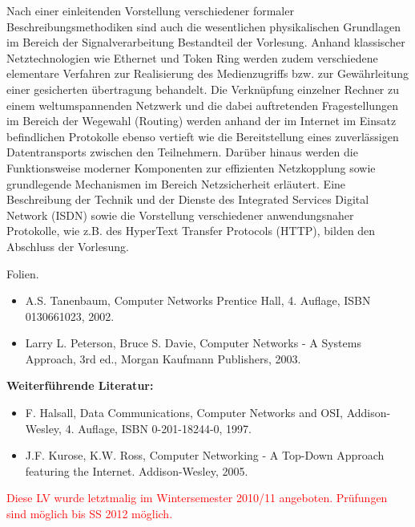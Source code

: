 \begin{course}
\begin{content}
Nach einer einleitenden Vorstellung verschiedener formaler Beschreibungsmethodiken sind auch die wesentlichen physikalischen Grundlagen im Bereich der Signalverarbeitung Bestandteil der Vorlesung. Anhand klassischer Netztechnologien wie Ethernet und Token Ring werden zudem verschiedene elementare Verfahren zur Realisierung des Medienzugriffs bzw. zur Gewährleitung einer gesicherten übertragung behandelt. Die Verknüpfung einzelner Rechner zu einem weltumspannenden Netzwerk und die dabei auftretenden Fragestellungen im Bereich der Wegewahl (Routing) werden anhand der im Internet im Einsatz befindlichen Protokolle ebenso vertieft wie die Bereitstellung eines zuverlässigen Datentransports zwischen den Teilnehmern. Darüber hinaus werden die Funktionsweise moderner Komponenten zur effizienten Netzkopplung sowie grundlegende Mechanismen im Bereich Netzsicherheit erläutert. Eine Beschreibung der Technik und der Dienste des Integrated Services Digital Network (ISDN) sowie die Vorstellung verschiedener anwendungsnaher Protokolle, wie z.B. des HyperText Transfer Protocols (HTTP), bilden den Abschluss der Vorlesung.


\end{content}

\begin{media}Folien.

\end{media}

\begin{literature}\begin{itemize}\item A.S. Tanenbaum, Computer Networks Prentice Hall, 4. Auflage, ISBN 0130661023, 2002.  \item Larry L. Peterson, Bruce S. Davie, Computer Networks - A Systems Approach, 3rd ed., Morgan Kaufmann Publishers, 2003.  \end{itemize}

\textbf{Weiterführende Literatur:}

 \begin{itemize}\item F. Halsall, Data Communications, Computer Networks and OSI, Addison-Wesley, 4. Auflage, ISBN 0-201-18244-0, 1997.  \item J.F. Kurose, K.W. Ross, Computer Networking - A Top-Down Approach featuring the Internet. Addison-Wesley, 2005.  \end{itemize}\end{literature}

\begin{remarks}\textcolor{red}{Diese LV wurde letztmalig im Wintersemester 2010/11 angeboten. Prüfungen sind möglich bis SS 2012 möglich.}

\end{remarks}

\end{course}